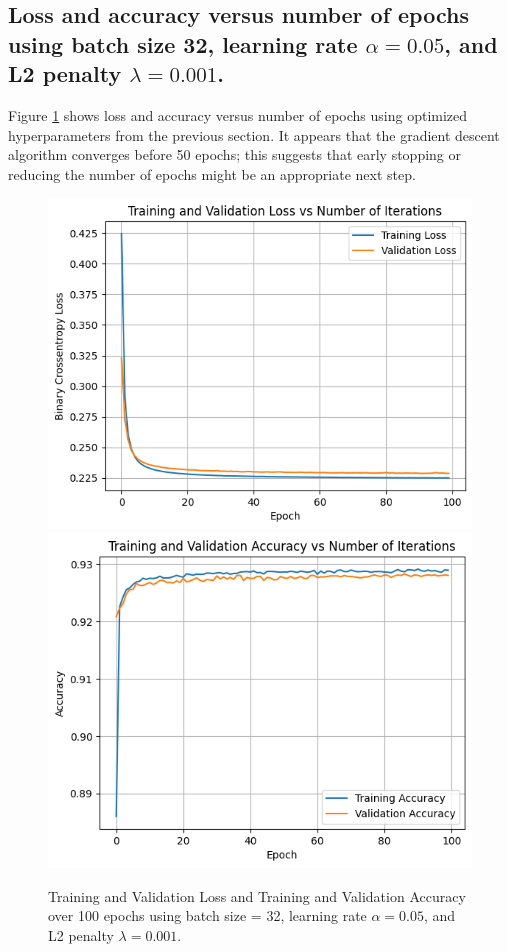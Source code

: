 \documentclass[letter]{article}
\begin{document}
\subsection{Loss and accuracy versus number of epochs using batch size 32, learning rate \texorpdfstring{$\alpha=0.05$}{alpha=0.05}, and L2 penalty \texorpdfstring{$\lambda=0.001$}{lambda=0.001}. }
Figure \ref{fig:epochs} shows loss and accuracy versus number of epochs using optimized hyperparameters from the previous section. It appears that the gradient descent algorithm converges before 50 epochs; this suggests that early stopping or reducing the number of epochs might be an appropriate next step.
\begin{figure}[H]
    \centering
    \includegraphics[scale=0.45]{appendix/b2-loss.png}
    \includegraphics[scale=0.45]{appendix/b2-acc.png}
    \caption{Training and Validation Loss and Training and Validation Accuracy over 100 epochs using batch size = 32, learning rate $\alpha=0.05$, and L2 penalty $\lambda=0.001$.}
    \label{fig:epochs}
\end{figure} 
\end{document}
